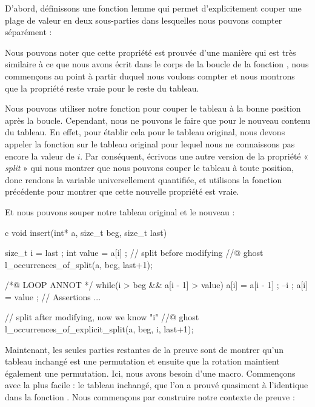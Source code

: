 D'abord, définissons une fonction lemme qui permet d'explicitement
couper une plage de valeur en deux sous-parties dans lesquelles nous pouvons
compter séparément :




Nous pouvons noter que cette propriété est prouvée d'une manière qui est très
similaire à ce que nous avons écrit dans le corps de la boucle de la fonction
, nous commençons au point à partir duquel nous
voulons compter et nous montrons que la propriété reste vraie pour le reste
du tableau.


Nous pouvons utiliser notre fonction pour couper le tableau à la bonne position
après la boucle. Cependant, nous ne pouvons le faire que pour le nouveau contenu
du tableau. En effet, pour établir cela pour le tableau original, nous devons
appeler la fonction sur le tableau original pour lequel nous ne connaissons pas
encore la valeur de $i$. Par conséquent, écrivons une autre version de la
propriété « \textit{split} » qui nous montrer que nous pouvons couper le tableau à toute
position, donc rendons la variable  universellement quantifiée,
et utilisons la fonction précédente pour montrer que cette nouvelle propriété est
vraie.




Et nous pouvons souper notre tableau original et le nouveau :


\begin{CodeBlock}{c}
void insert(int* a, size_t beg, size_t last){
  size_t i = last ;
  int value = a[i] ;
  // split before modifying
  //@ ghost l_occurrences_of_split(a, beg, last+1);

  /*@ LOOP ANNOT */
  while(i > beg && a[i - 1] > value){
    a[i] = a[i - 1] ;
    --i ;
  }
  a[i] = value ;
  // Assertions ...

  // split after modifying, now we know "i"
  //@ ghost l_occurrences_of_explicit_split(a, beg, i, last+1);
}
\end{CodeBlock}


Maintenant, les seules parties restantes de la preuve sont de montrer qu'un tableau
inchangé est une permutation et ensuite que la rotation maintient également une
permutation. Ici, nous avons besoin d'une macro. Commençons avec la plus facile :
le tableau inchangé, que l'on a prouvé quasiment à l'identique dans la fonction
. Nous commençons par construire notre contexte de
preuve :


